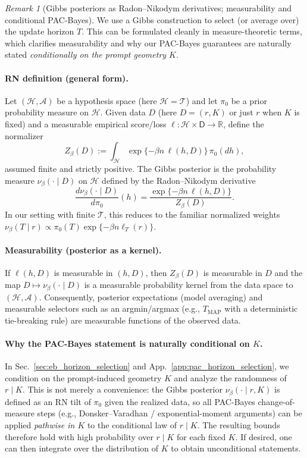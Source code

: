 \documentclass{article}
\theoremstyle{plain}
\theoremstyle{definition}
\theoremstyle{remark}
\newtheorem{remark}[theorem]{Remark}
\begin{document}
\begin{remark}[Gibbs posteriors as Radon--Nikodym derivatives; measurability and conditional PAC-Bayes]
\label{rem:gibbs_rn_pacbayes}
We use a Gibbs construction to select (or average over) the update horizon $T$.
This can be formulated cleanly in measure-theoretic terms, which clarifies measurability and why
our PAC-Bayes guarantees are naturally stated \emph{conditionally on the prompt geometry $K$}.

\paragraph{RN definition (general form).}
Let $(\mathcal H,\mathcal A)$ be a hypothesis space (here $\mathcal H=\mathcal T$) and let $\pi_0$ be a prior probability measure on $\mathcal H$.
Given data $D$ (here $D=(r,K)$ or just $r$ when $K$ is fixed) and a measurable empirical score/loss
$\ell:\mathcal H\times \mathsf D\to\mathbb R$,
define the normalizer
\[
Z_\beta(D):=\int_{\mathcal H} \exp\{-\beta n\,\ell(h,D)\}\,\pi_0(dh),
\]
assumed finite and strictly positive.
The Gibbs posterior is the probability measure $\nu_\beta(\cdot\mid D)$ on $\mathcal H$ defined by the Radon--Nikodym derivative
\[
\frac{d\nu_\beta(\cdot\mid D)}{d\pi_0}(h)
=
\frac{\exp\{-\beta n\,\ell(h,D)\}}{Z_\beta(D)}.
\]
In our setting with finite $\mathcal T$, this reduces to the familiar normalized weights
$\nu_\beta(T\mid r)\propto \pi_0(T)\exp\{-\beta n\ell_T(r)\}$.

\paragraph{Measurability (posterior as a kernel).}
If $\ell(h,D)$ is measurable in $(h,D)$, then $Z_\beta(D)$ is measurable in $D$ and the map
$D\mapsto \nu_\beta(\cdot\mid D)$ is a measurable probability kernel from the data space to $(\mathcal H,\mathcal A)$.
Consequently, posterior expectations (model averaging) and measurable selectors such as an argmin/argmax
(e.g., $T_{\mathrm{MAP}}$ with a deterministic tie-breaking rule) are measurable functions of the observed data.

\paragraph{Why the PAC-Bayes statement is naturally conditional on $K$.}
In Sec.~\ref{sec:eb_horizon_selection} and App.~\ref{app:pac_horizon_selection}, we condition on the prompt-induced geometry $K$ and analyze the randomness of $r\mid K$.
This is not merely a convenience: the Gibbs posterior $\nu_\beta(\cdot\mid r,K)$ is defined as an RN tilt of $\pi_0$ given the realized data,
so all PAC-Bayes change-of-measure steps (e.g., Donsker--Varadhan / exponential-moment arguments) can be applied
\emph{pathwise in $K$} to the conditional law of $r\mid K$.
The resulting bounds therefore hold with high probability over $r\mid K$ for each fixed $K$.
If desired, one can then integrate over the distribution of $K$ to obtain unconditional statements.
\end{remark}
\end{document}
